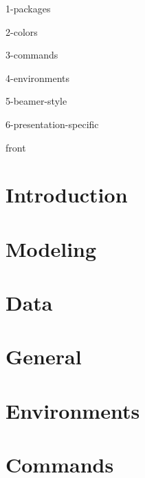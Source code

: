 \def\shareable{0}

\usepackage{import}

\newcommand{\configpath}{.config/}

{1-packages}

{2-colors}

{3-commands}

{4-environments}

{5-beamer-style}

{6-presentation-specific}

{front} %

\section{Introduction}


\section{Modeling}


\section{Data}


\section{General}


\section{Environments}


\section{Commands}


